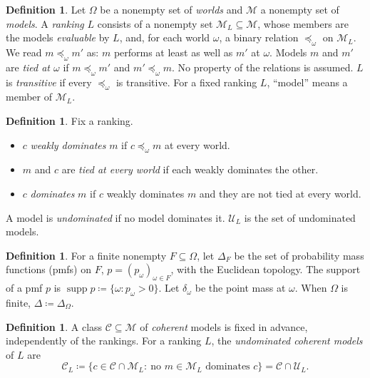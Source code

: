 \documentclass[11pt]{article}
\theoremstyle{definition}
\newtheorem{definition}[theorem]{Definition}
\newcommand{\M}{\mathcal M}
\newcommand{\C}{\mathcal C}
\newcommand{\U}{\mathcal U}
\newcommand{\supp}{\operatorname{supp}}
\begin{document}
\begin{definition}\label{def:rankings}
Let $\Omega$ be a nonempty set of \emph{worlds} and $\M$ a nonempty set of \emph{models}. A \emph{ranking} $L$ consists of a nonempty set $\M_L\subseteq\M$, whose members are the models \emph{evaluable} by $L$, and, for each world $\omega$, a binary relation $\preceq_\omega$ on $\M_L$. We read $m\preceq_\omega m'$ as: $m$ performs at least as well as $m'$ at $\omega$. Models $m$ and $m'$ are \emph{tied at $\omega$} if $m\preceq_\omega m'$ and $m'\preceq_\omega m$. No property of the relations is assumed. $L$ is \emph{transitive} if every $\preceq_\omega$ is transitive. For a fixed ranking $L$, ``model'' means a member of $\M_L$.
\end{definition}

\begin{definition}\label{def:dominance}
Fix a ranking.
\begin{itemize}[leftmargin=*]
\item $c$ \emph{weakly dominates} $m$ if $c\preceq_\omega m$ at every world.
\item $m$ and $c$ are \emph{tied at every world} if each weakly dominates the other.
\item $c$ \emph{dominates} $m$ if $c$ weakly dominates $m$ and they are not tied at every world.
\end{itemize}
A model is \emph{undominated} if no model dominates it. $\U_L$ is the set of undominated models.
\end{definition}

\begin{definition}\label{def:priors}
For a finite nonempty $F\subseteq\Omega$, let $\Delta_F$ be the set of probability mass functions (pmfs) on $F$, $p=(p_\omega)_{\omega\in F}$, with the Euclidean topology. The support of a pmf $p$ is $\supp p\coloneqq\{\omega:p_\omega>0\}$. Let $\delta_\omega$ be the point mass at $\omega$. When $\Omega$ is finite, $\Delta\coloneqq\Delta_\Omega$.
\end{definition}

\begin{definition}\label{def:coherence-property}
A class $\C\subseteq\M$ of \emph{coherent} models is fixed in advance, independently of the rankings. For a ranking $L$, the \emph{undominated coherent models} of $L$ are
\[
\C_L\coloneqq\{c\in\C\cap\M_L:\ \text{no } m\in\M_L \text{ dominates } c\}=\C\cap\U_L.
\]
\end{definition}
\end{document}
